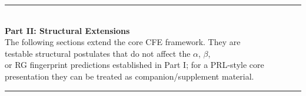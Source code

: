 \vspace{1em}
\begin{center}
\rule{0.8\textwidth}{0.5pt}\\[0.5em]
{\Large\bfseries Part II: Structural Extensions}\\[0.3em]
{\small The following sections extend the core CFE framework. They are \\
testable structural postulates that do not affect the $\alpha$, $\beta$, \\
or RG fingerprint predictions established in Part I; for a PRL-style core \\
presentation they can be treated as companion/supplement material.}\\[0.5em]
\rule{0.8\textwidth}{0.5pt}
\end{center}
\vspace{1em}

